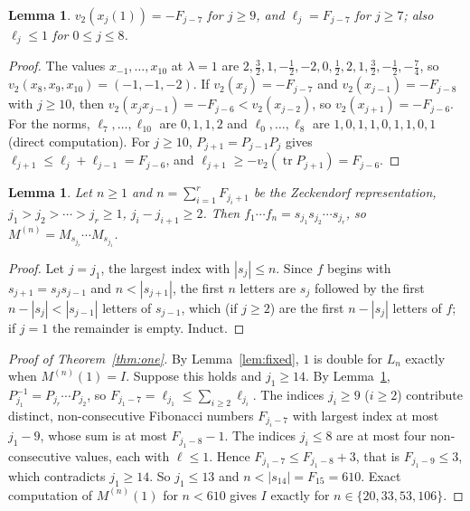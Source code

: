 \documentclass[11pt]{amsart}
\newtheorem{lemma}[theorem]{Lemma}
\theoremstyle{definition}
\newcommand{\tr}{\operatorname{tr}}
\begin{document}
\begin{lemma}\label{lem:escape}
$v_2(x_j(1))=-F_{j-7}$ for $j\ge9$, and $\ell_j=F_{j-7}$ for $j\ge7$; also $\ell_j\le1$ for $0\le j\le8$.
\end{lemma}

\begin{proof}
The values $x_{-1},\dots,x_{10}$ at $\lambda=1$ are $2,\tfrac32,1,-\tfrac12,-2,0,\tfrac12,2,1,\tfrac32,-\tfrac12,-\tfrac74$,
so $v_2(x_8,x_9,x_{10})=(-1,-1,-2)$. If $v_2(x_j)=-F_{j-7}$ and $v_2(x_{j-1})=-F_{j-8}$ with $j\ge10$, then
$v_2(x_jx_{j-1})=-F_{j-6}<v_2(x_{j-2})$, so $v_2(x_{j+1})=-F_{j-6}$. For the norms, $\ell_7,\dots,\ell_{10}$
are $0,1,1,2$ and $\ell_0,\dots,\ell_8$ are $1,0,1,1,0,1,1,0,1$ (direct computation). For $j\ge10$,
$P_{j+1}=P_{j-1}P_j$ gives $\ell_{j+1}\le\ell_j+\ell_{j-1}=F_{j-6}$, and $\ell_{j+1}\ge-v_2(\tr P_{j+1})=F_{j-6}$.
\end{proof}

\begin{lemma}\label{lem:zeck}
Let $n\ge1$ and $n=\sum_{i=1}^r F_{j_i+1}$ be the Zeckendorf representation, $j_1>j_2>\cdots>j_r\ge1$,
$j_i-j_{i+1}\ge2$. Then $f_1\cdots f_n=s_{j_1}s_{j_2}\cdots s_{j_r}$, so $M^{(n)}=M_{s_{j_r}}\cdots M_{s_{j_1}}$.
\end{lemma}

\begin{proof}
Let $j=j_1$, the largest index with $|s_j|\le n$. Since $f$ begins with $s_{j+1}=s_js_{j-1}$ and
$n<|s_{j+1}|$, the first $n$ letters are $s_j$ followed by the first $n-|s_j|<|s_{j-1}|$ letters of
$s_{j-1}$, which (if $j\ge2$) are the first $n-|s_j|$ letters of $f$; if $j=1$ the remainder is empty.
Induct.
\end{proof}

\begin{proof}[Proof of Theorem~\ref{thm:one}]
By Lemma~\ref{lem:fixed}, $1$ is double for $L_n$ exactly when $M^{(n)}(1)=I$. Suppose this holds and
$j_1\ge14$. By Lemma~\ref{lem:zeck}, $P_{j_1}^{-1}=P_{j_r}\cdots P_{j_2}$, so
$F_{j_1-7}=\ell_{j_1}\le\sum_{i\ge2}\ell_{j_i}$. The indices $j_i\ge9$ ($i\ge2$) contribute distinct,
non-consecutive Fibonacci numbers $F_{j_i-7}$ with largest index at most $j_1-9$, whose sum is at most
$F_{j_1-8}-1$. The indices $j_i\le8$ are at most four non-consecutive values, each with $\ell\le1$. Hence
$F_{j_1-7}\le F_{j_1-8}+3$, that is $F_{j_1-9}\le3$, which contradicts $j_1\ge14$. So $j_1\le13$ and
$n<|s_{14}|=F_{15}=610$. Exact computation of $M^{(n)}(1)$ for $n<610$ gives $I$ exactly for
$n\in\{20,33,53,106\}$.
\end{proof}
\end{document}
